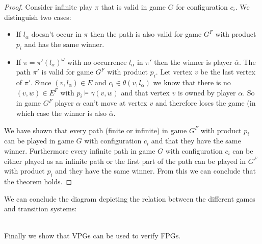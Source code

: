 \begin{theorem}
\begin{proof}
		Consider infinite play $\pi$ that is valid in game $G$ for configuration $c_i$. We distinguish two cases:
		\begin{itemize}
			\item If $l_\alpha$ doesn't occur in $\pi$ then the path is also valid for game $G^F$ with product $p_i$ and has the same winner.
			\item If $\pi = \pi'(l_\alpha)^\omega$ with no occurrence $l_\alpha$ in $\pi'$ then the winner is player $\overline{\alpha}$. The path $\pi'$ is valid for game $G^F$ with product $p_i$. Let vertex $v$ be the last vertex of $\pi'$. Since $(v, l_\alpha) \in E$ and $c_i \in \theta(v,l_\alpha)$ we know that there is no $(v,w) \in E^F$ with $p_i \models \gamma(v,w)$ and that vertex $v$ is owned by player $\alpha$. So in game $G^F$ player $\alpha$ can't move at vertex $v$ and therefore loses the game (in which case the winner is also $\overline{\alpha}$.
		\end{itemize}
		
		We have shown that every path (finite or infinite) in game $G^F$ with product $p_i$ can be played in game $G$ with configuration $c_i$ and that they have the same winner. Furthermore every infinite path in game $G$ with configuration $c_i$ can be either played as an infinite path or the first part of the path can be played in $G^F$ with product $p_i$ and they have the same winner. From this we can conclude that the theorem holds.
	\end{proof}
\end{theorem}
We can conclude the diagram depicting the relation between the different games and transition systems:\\
\\
Finally we show that VPGs can be used to verify FPGs.
